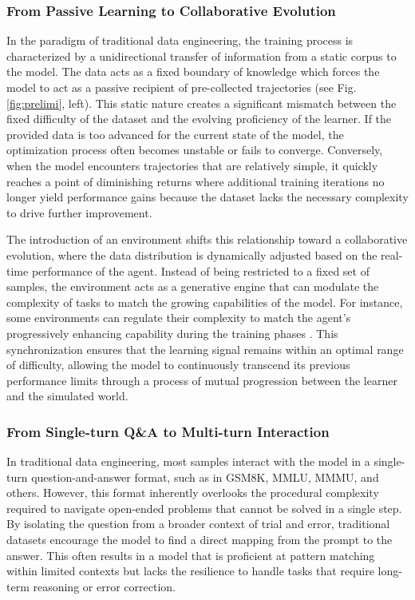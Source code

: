 \documentclass{llmxive}
\begin{document}
\subsubsection{From Passive Learning to Collaborative Evolution}
In the paradigm of traditional data engineering, the training process is characterized by a unidirectional transfer of information from a static corpus to the model. The data acts as a fixed boundary of knowledge which forces the model to act as a passive recipient of pre-collected trajectories (see Fig. \ref{fig:prelimi}, left). This static nature creates a significant mismatch between the fixed difficulty of the dataset and the evolving proficiency of the learner. If the provided data is too advanced for the current state of the model, the optimization process often becomes unstable or fails to converge. Conversely, when the model encounters trajectories that are relatively simple, it quickly reaches a point of diminishing returns where additional training iterations no longer yield performance gains because the dataset lacks the necessary complexity to drive further improvement.

The introduction of an environment shifts this relationship toward a collaborative evolution, where the data distribution is dynamically adjusted based on the real-time performance of the agent. Instead of being restricted to a fixed set of samples, the environment acts as a generative engine that can modulate the complexity of tasks to match the growing capabilities of the model. For instance, some environments can regulate their complexity to match the agent’s progressively enhancing capability during the training phases \cite{AgentGen, DreamGym, SCALER}. This synchronization ensures that the learning signal remains within an optimal range of difficulty, allowing the model to continuously transcend its previous performance limits through a process of mutual progression between the learner and the simulated world.

\subsubsection{From Single-turn Q\&A to Multi-turn Interaction}
In traditional data engineering, most samples interact with the model in a single-turn question-and-answer format, such as in GSM8K\cite{GSM8k}, MMLU\cite{mmlu}, MMMU\cite{mmmu}, and others\cite{RAG-RewardBench}. However, this format inherently overlooks the procedural complexity required to navigate open-ended problems that cannot be solved in a single step. By isolating the question from a broader context of trial and error, traditional datasets encourage the model to find a direct mapping from the prompt to the answer. This often results in a model that is proficient at pattern matching within limited contexts but lacks the resilience to handle tasks that require long-term reasoning or error correction.
\end{document}
